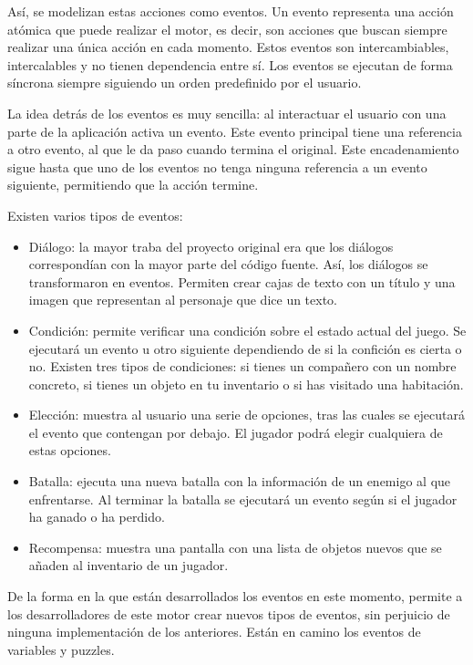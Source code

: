 Así, se modelizan estas acciones como eventos. Un evento representa una acción atómica que puede realizar el motor, es decir, son acciones que buscan siempre realizar una única acción en cada momento.
Estos eventos son intercambiables, intercalables y no tienen dependencia entre sí. 
Los eventos se ejecutan de forma síncrona siempre siguiendo un orden predefinido por el usuario.

La idea detrás de los eventos es muy sencilla: al interactuar el usuario con una parte de la aplicación activa un evento. Este evento principal tiene una referencia a otro evento, al que le da paso cuando termina el original. Este encadenamiento sigue hasta que uno de los eventos no tenga ninguna referencia a un evento siguiente, permitiendo que la acción termine.

Existen varios tipos de eventos:

\begin{itemize}
	\item Diálogo: la mayor traba del proyecto original era que los diálogos correspondían con la mayor parte del código fuente. Así, los diálogos se transformaron en eventos. Permiten crear cajas de texto con un título y una imagen que representan al personaje que dice un texto.
	\item Condición: permite verificar una condición sobre el estado actual del juego. Se ejecutará un evento u otro siguiente dependiendo de si la confición es cierta o no. Existen tres tipos de condiciones: si tienes un compañero con un nombre concreto, si tienes un objeto en tu inventario o si has visitado una habitación.
	\item Elección: muestra al usuario una serie de opciones, tras las cuales se ejecutará el evento que contengan por debajo. El jugador podrá elegir cualquiera de estas opciones. 
	\item Batalla: ejecuta una nueva batalla con la información de un enemigo al que enfrentarse. Al terminar la batalla se ejecutará un evento según si el jugador ha ganado o ha perdido.
	\item Recompensa: muestra una pantalla con una lista de objetos nuevos que se añaden al inventario de un jugador.
\end{itemize} 

De la forma en la que están desarrollados los eventos en este momento, permite a los desarrolladores de este motor crear nuevos tipos de eventos, sin perjuicio de ninguna implementación de los anteriores. Están en camino los eventos de variables y puzzles.


